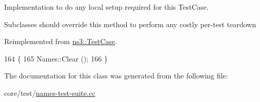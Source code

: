 Implementation to do any local setup required for this Test\+Case. 

Subclasses should override this method to perform any costly per-\/test teardown 

Reimplemented from \hyperlink{classns3_1_1TestCase_a8917f1604e28d312a8086f76291e3c46}{ns3\+::\+Test\+Case}.


\begin{DoxyCode}
164 \{
165   Names::Clear ();
166 \}
\end{DoxyCode}


The documentation for this class was generated from the following file\+:\begin{DoxyCompactItemize}
\item 
core/test/\hyperlink{names-test-suite_8cc}{names-\/test-\/suite.\+cc}\end{DoxyCompactItemize}
